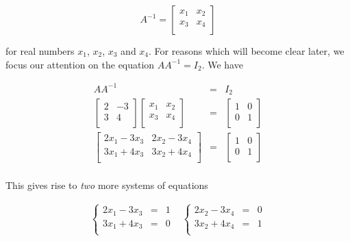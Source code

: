 \documentclass{ximera}
\begin{document}
\[  A^{-1} = \left[ \begin{array}{rr} x_1 & x_2 \\ x_3 & x_4 \\ \end{array} \right]\]

for real numbers $x_1$, $x_2$, $x_3$ and $x_4$.  For reasons which will become clear later, we focus our attention on the equation $AA^{-1} = I_2$.  We have

\[\begin{array}{rcl}

AA^{-1} & = & I_{2} \\  

\left[ \begin{array}{rr} 2 & -3 \\ 3 & 4 \\ \end{array} \right] \left[ \begin{array}{rr} x_1 & x_2 \\ x_3 & x_4 \\ \end{array} \right]  & = & \left[ \begin{array}{rr} 1 & 0 \\ 0 & 1 \\ \end{array} \right] \\  

\left[ \begin{array}{rr} 2x_1 - 3x_3 &  2x_2 - 3x_4 \\ 3x_1 +4x_3 &  3x_2 +4x_4 \\ \end{array} \right]  & = & \left[ \begin{array}{rr} 1 & 0 \\ 0 & 1 \\ \end{array} \right] \\

\end{array} \] 

This gives rise to \textit{two} more systems of equations

\[\begin{array}{cc}

\left\{ \begin{array}{rcr} 2x_1-3x_3 & = & 1 \\ 3x_1+4x_3 & = & 0 \\ \end{array} \right.

&

\left\{ \begin{array}{rcr} 2x_2-3x_4 & = & 0 \\ 3x_2+4x_4 & = & 1 \\ \end{array} \right.

\end{array}\]
\end{document}
